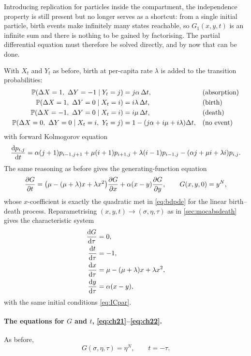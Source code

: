Introducing replication for particles inside the compartment, the independence
property is still present but no longer serves as a shortcut: from a single initial
particle, birth events make infinitely many states reachable, so $G_1(x,y,t)$ is an
infinite sum and there is nothing to be gained by factorising. The partial
differential equation must therefore be solved directly, and by now that can be
done.

With $X_t$ and $Y_t$ as before, birth at per-capita rate $\lambda$ is added to the
transition probabilities:
\begin{align*}
\mathbb{P}\!\left(\Delta X = 1,\ \Delta Y = -1 \mid Y_t=j\right) &= j\alpha\,\Delta t, &&\text{(absorption)}\\
\mathbb{P}\!\left(\Delta X = 1,\ \Delta Y = 0 \mid X_t=i\right) &= i\lambda\,\Delta t, &&\text{(birth)}\\
\mathbb{P}\!\left(\Delta X = -1,\ \Delta Y = 0 \mid X_t=i\right) &= i\mu\,\Delta t, &&\text{(death)}\\
\mathbb{P}\!\left(\Delta X = 0,\ \Delta Y = 0 \mid X_t=i,\ Y_t=j\right) &= 1-(j\alpha+i\mu+i\lambda)\Delta t, &&\text{(no event)}
\end{align*}
with forward Kolmogorov equation
\begin{equation}
\label{eq:FK3}
\frac{\mathrm{d} p_{i,j}}{\mathrm{d} t} = \alpha(j+1)p_{i-1,j+1} + \mu(i+1)p_{i+1,j} + \lambda(i-1)p_{i-1,j}
- (\alpha j+\mu i+\lambda i)p_{i,j} .
\end{equation}
The same reasoning as before gives the generating-function equation
\begin{equation}
\label{eq:PDE3}
\frac{\partial G}{\partial t} = \bigl(\mu-(\mu+\lambda)x+\lambda x^2\bigr)\frac{\partial G}{\partial x} + \alpha(x-y)\frac{\partial G}{\partial y},
\qquad G(x,y,0)=y^N ,
\end{equation}
whose $x$-coefficient is exactly the quadratic met in \cref{eq:bdpde} for the
linear birth--death process. Reparametrising $(x,y,t)\to(\sigma,\eta,\tau)$ as in
\cref{sec:mocabsdeath} gives the characteristic system
\begin{align}
\frac{\mathrm{d} G}{\mathrm{d} \tau} &= 0, \label{eq:ch21}\\
\frac{\mathrm{d} t}{\mathrm{d} \tau} &= -1, \label{eq:ch22}\\
\frac{\mathrm{d} x}{\mathrm{d} \tau} &= \mu-(\mu+\lambda)x+\lambda x^2, \label{eq:ch23}\\
\frac{\mathrm{d} y}{\mathrm{d} \tau} &= \alpha(x-y), \label{eq:ch24}
\end{align}
with the same initial conditions \cref{eq:ICpar}.

\paragraph{The equations for $G$ and $t$, \eqref{eq:ch21}--\eqref{eq:ch22}.}
As before,
\begin{equation}
\label{eq:GetaN2}
G(\sigma,\eta,\tau) = \eta^N,
\qquad
t = -\tau .
\end{equation}

